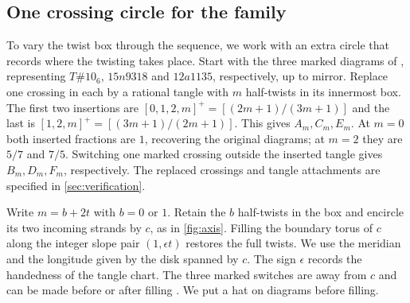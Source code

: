 \documentclass[a4paper,11pt]{amsart}
\numberwithin{equation}{subsection}
\theoremstyle{plain}
\theoremstyle{remark}
\begin{document}
\subsection{One crossing circle for the family}\label{sub:circle}

To vary the twist box through the sequence, we work with an extra
circle that records where the twisting takes place. Start with
the three marked diagrams of \cite[Theorem~1.3]{BH-small},
representing $T\#10_6$, $15n9318$ and $12a1135$, respectively,
up to mirror. Replace one crossing in each by a rational tangle
with $m$ half-twists in its innermost box. The first two insertions
are $[0,1,2,m]^+=[(2m+1)/(3m+1)]$ and the last is
$[1,2,m]^+=[(3m+1)/(2m+1)]$. This gives $A_m,C_m,E_m$.
At $m=0$ both inserted fractions are $1$, recovering the original
diagrams; at $m=2$ they are $5/7$ and $7/5$.
Switching one marked crossing outside the inserted tangle gives
$B_m,D_m,F_m$, respectively. The replaced crossings and tangle
attachments are specified in \autoref{sec:verification}.

Write $m=b+2t$ with $b=0$ or $1$. Retain the $b$ half-twists in the box and encircle its two incoming strands by $c$, as in \autoref{fig:axis}. Filling the boundary torus of $c$ along the integer slope pair $(1,\epsilon t)$ restores the full twists. We use the meridian and the longitude given by the disk spanned by $c$. The sign $\epsilon$ records the handedness of the tangle chart. The three marked switches are away from $c$ and can be made before or after filling \cite[Lemma~2.2]{BMM}. We put a hat on diagrams before filling.
\end{document}
